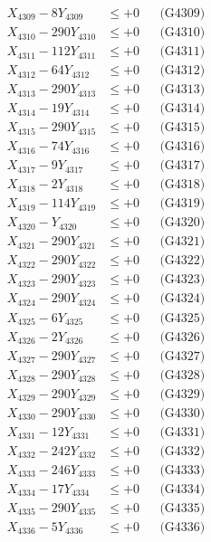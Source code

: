 \documentclass[a4paper,10pt]{article}
\begin{document}
{\begin{align}
X_{4309} - 8Y_{4309} &\leq +0 && \text{(G4309)} \\
X_{4310} - 290Y_{4310} &\leq +0 && \text{(G4310)} \\
\allowbreak
X_{4311} - 112Y_{4311} &\leq +0 && \text{(G4311)} \\
X_{4312} - 64Y_{4312} &\leq +0 && \text{(G4312)} \\
X_{4313} - 290Y_{4313} &\leq +0 && \text{(G4313)} \\
X_{4314} - 19Y_{4314} &\leq +0 && \text{(G4314)} \\
X_{4315} - 290Y_{4315} &\leq +0 && \text{(G4315)} \\
X_{4316} - 74Y_{4316} &\leq +0 && \text{(G4316)} \\
X_{4317} - 9Y_{4317} &\leq +0 && \text{(G4317)} \\
X_{4318} - 2Y_{4318} &\leq +0 && \text{(G4318)} \\
X_{4319} - 114Y_{4319} &\leq +0 && \text{(G4319)} \\
X_{4320} - Y_{4320} &\leq +0 && \text{(G4320)} \\
\allowbreak
X_{4321} - 290Y_{4321} &\leq +0 && \text{(G4321)} \\
X_{4322} - 290Y_{4322} &\leq +0 && \text{(G4322)} \\
X_{4323} - 290Y_{4323} &\leq +0 && \text{(G4323)} \\
X_{4324} - 290Y_{4324} &\leq +0 && \text{(G4324)} \\
X_{4325} - 6Y_{4325} &\leq +0 && \text{(G4325)} \\
X_{4326} - 2Y_{4326} &\leq +0 && \text{(G4326)} \\
X_{4327} - 290Y_{4327} &\leq +0 && \text{(G4327)} \\
X_{4328} - 290Y_{4328} &\leq +0 && \text{(G4328)} \\
X_{4329} - 290Y_{4329} &\leq +0 && \text{(G4329)} \\
X_{4330} - 290Y_{4330} &\leq +0 && \text{(G4330)} \\
\allowbreak
X_{4331} - 12Y_{4331} &\leq +0 && \text{(G4331)} \\
X_{4332} - 242Y_{4332} &\leq +0 && \text{(G4332)} \\
X_{4333} - 246Y_{4333} &\leq +0 && \text{(G4333)} \\
X_{4334} - 17Y_{4334} &\leq +0 && \text{(G4334)} \\
X_{4335} - 290Y_{4335} &\leq +0 && \text{(G4335)} \\
X_{4336} - 5Y_{4336} &\leq +0 && \text{(G4336)} \\

\end{align}}
\end{document}
